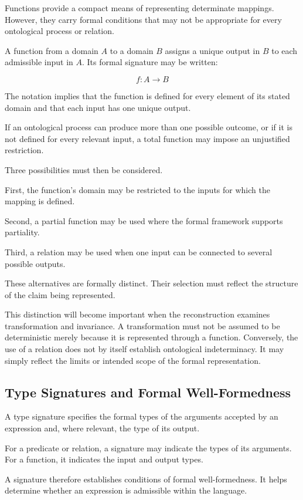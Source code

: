 Functions provide
a compact means
of representing
determinate mappings.
However, they carry
formal conditions
that may not be
appropriate for
every ontological
process or relation.

A function from
a domain \(A\)
to a domain \(B\)
assigns a unique
output in \(B\)
to each admissible
input in \(A\).
Its formal signature
may be written:

\[
f : A \rightarrow B
\]

The notation implies
that the function
is defined for
every element of
its stated domain
and that each
input has one
unique output.

If an ontological
process can produce
more than one
possible outcome,
or if it is not
defined for every
relevant input,
a total function
may impose an
unjustified restriction.

Three possibilities
must then be
considered.

First, the
function's domain
may be restricted
to the inputs
for which the
mapping is defined.

Second, a partial
function may be
used where the
formal framework
supports partiality.

Third, a relation
may be used
when one input
can be connected
to several possible
outputs.

These alternatives
are formally distinct.
Their selection
must reflect the
structure of the
claim being represented.

This distinction
will become
important when
the reconstruction
examines transformation
and invariance.
A transformation
must not be
assumed to be
deterministic merely
because it is
represented through
a function. Conversely,
the use of a
relation does not
by itself establish
ontological indeterminacy.
It may simply
reflect the limits
or intended scope
of the formal
representation.

\subsection{Type Signatures and Formal Well-Formedness}

A type signature
specifies the formal
types of the
arguments accepted
by an expression
and, where relevant,
the type of
its output.

For a predicate
or relation, a
signature may
indicate the
types of its
arguments. For
a function, it
indicates the
input and output
types.

A signature
therefore establishes
conditions of
formal well-formedness.
It helps determine
whether an expression
is admissible
within the language.


